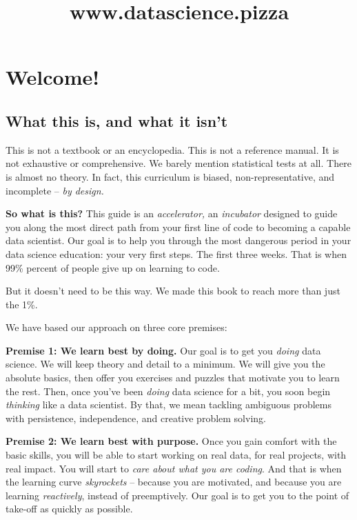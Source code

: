 \documentclass[]{book}
\title{www.datascience.pizza}
\author{}
\date{\vspace{-2.5em}}
\begin{document}
\maketitle

{
\setcounter{tocdepth}{1}
\tableofcontents
}
\hypertarget{welcome}{%
\chapter{Welcome!}\label{welcome}}

\hypertarget{what-this-is-and-what-it-isnt}{%
\section*{What this is, and what it isn't}\label{what-this-is-and-what-it-isnt}}

This is not a textbook or an encyclopedia. This is not a reference manual. It is not exhaustive or comprehensive. We barely mention statistical tests at all. There is almost no theory. In fact, this curriculum is biased, non-representative, and incomplete -- \emph{by design.}

\textbf{So what is this?} This guide is an \emph{accelerator,} an \emph{incubator} designed to guide you along the most direct path from your first line of code to becoming a capable data scientist. Our goal is to help you through the most dangerous period in your data science education: your very first steps. The first three weeks. That is when 99\% percent of people give up on learning to code.

But it doesn't need to be this way. We made this book to reach more than just the 1\%.

We have based our approach on three core premises:

\textbf{Premise 1: We learn best by doing.} Our goal is to get you \emph{doing} data science. We will keep theory and detail to a minimum. We will give you the absolute basics, then offer you exercises and puzzles that motivate you to learn the rest. Then, once you've been \emph{doing} data science for a bit, you soon begin \emph{thinking} like a data scientist. By that, we mean tackling ambiguous problems with persistence, independence, and creative problem solving.

\textbf{Premise 2: We learn best with purpose.} Once you gain comfort with the basic skills, you will be able to start working on real data, for real projects, with real impact. You will start to \emph{care about what you are coding}. And that is when the learning curve \emph{skyrockets} -- because you are motivated, and because you are learning \emph{reactively}, instead of preemptively. Our goal is to get you to the point of take-off as quickly as possible.
\end{document}
